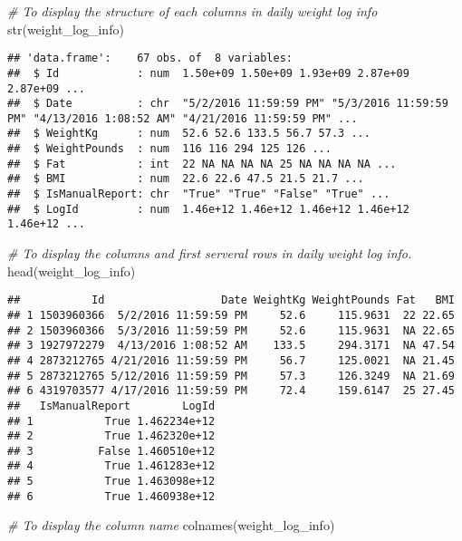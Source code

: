 \documentclass[
]{article}
\newenvironment{Shaded}{\begin{snugshade}}{\end{snugshade}}
\newcommand{\CommentTok}[1]{\textcolor[rgb]{0.56,0.35,0.01}{\textit{#1}}}
\newcommand{\FunctionTok}[1]{\textcolor[rgb]{0.00,0.00,0.00}{#1}}
\newcommand{\NormalTok}[1]{#1}
\begin{document}
\begin{Shaded}
\begin{Highlighting}[]
\CommentTok{\# To display the structure of each columns in daily weight log info}
\FunctionTok{str}\NormalTok{(weight\_log\_info)}
\end{Highlighting}
\end{Shaded}

\begin{verbatim}
## 'data.frame':    67 obs. of  8 variables:
##  $ Id            : num  1.50e+09 1.50e+09 1.93e+09 2.87e+09 2.87e+09 ...
##  $ Date          : chr  "5/2/2016 11:59:59 PM" "5/3/2016 11:59:59 PM" "4/13/2016 1:08:52 AM" "4/21/2016 11:59:59 PM" ...
##  $ WeightKg      : num  52.6 52.6 133.5 56.7 57.3 ...
##  $ WeightPounds  : num  116 116 294 125 126 ...
##  $ Fat           : int  22 NA NA NA NA 25 NA NA NA NA ...
##  $ BMI           : num  22.6 22.6 47.5 21.5 21.7 ...
##  $ IsManualReport: chr  "True" "True" "False" "True" ...
##  $ LogId         : num  1.46e+12 1.46e+12 1.46e+12 1.46e+12 1.46e+12 ...
\end{verbatim}

\begin{Shaded}
\begin{Highlighting}[]
\CommentTok{\# To display the columns and first serveral rows in daily weight log info.}
\FunctionTok{head}\NormalTok{(weight\_log\_info)}
\end{Highlighting}
\end{Shaded}

\begin{verbatim}
##           Id                  Date WeightKg WeightPounds Fat   BMI
## 1 1503960366  5/2/2016 11:59:59 PM     52.6     115.9631  22 22.65
## 2 1503960366  5/3/2016 11:59:59 PM     52.6     115.9631  NA 22.65
## 3 1927972279  4/13/2016 1:08:52 AM    133.5     294.3171  NA 47.54
## 4 2873212765 4/21/2016 11:59:59 PM     56.7     125.0021  NA 21.45
## 5 2873212765 5/12/2016 11:59:59 PM     57.3     126.3249  NA 21.69
## 6 4319703577 4/17/2016 11:59:59 PM     72.4     159.6147  25 27.45
##   IsManualReport        LogId
## 1           True 1.462234e+12
## 2           True 1.462320e+12
## 3          False 1.460510e+12
## 4           True 1.461283e+12
## 5           True 1.463098e+12
## 6           True 1.460938e+12
\end{verbatim}

\begin{Shaded}
\begin{Highlighting}[]
\CommentTok{\# To display the column name }
\FunctionTok{colnames}\NormalTok{(weight\_log\_info)}
\end{Highlighting}
\end{Shaded}
\end{document}
